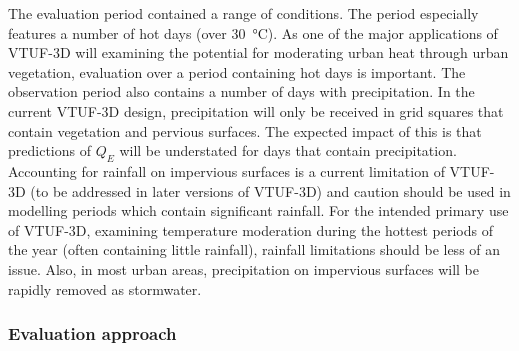 \documentclass[final,3p,times,authoryear]{elsarticle}
\begin{document}
The evaluation period contained a range of conditions. The period especially features a number of hot days (over \SI{30}{\degreeCelsius}). As one of the major applications of VTUF-3D will examining the potential for moderating urban heat through urban vegetation, evaluation over a period containing hot days is important. The observation period also contains a number of days with precipitation. In the current VTUF-3D design, precipitation will only be received in grid squares that contain vegetation and pervious surfaces. The expected impact of this is that predictions of $Q_{E}$ will be understated for days that contain precipitation. Accounting for rainfall on impervious surfaces is a current limitation of VTUF-3D (to be addressed in later versions of VTUF-3D) and caution should be used in modelling periods which contain significant rainfall. For the intended primary use of VTUF-3D, examining temperature moderation during the hottest periods of the year (often containing little rainfall), rainfall limitations should be less of an issue. Also, in most urban areas, precipitation on impervious surfaces will be rapidly removed as stormwater.

\subsubsection{Evaluation approach}\label{sec:prvalresults}
\end{document}
